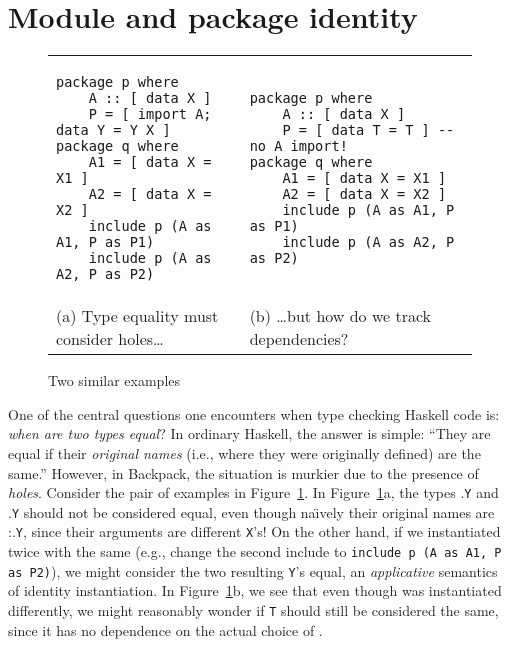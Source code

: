 \documentclass{article}
\begin{document}
\clearpage

\section{Module and package identity}

\begin{figure}[H]
\begin{tabular}{p{} p{}}
\begin{verbatim}
package p where
    A :: [ data X ]
    P = [ import A; data Y = Y X ]
package q where
    A1 = [ data X = X1 ]
    A2 = [ data X = X2 ]
    include p (A as A1, P as P1)
    include p (A as A2, P as P2)
\end{verbatim}
&
\begin{verbatim}
package p where
    A :: [ data X ]
    P = [ data T = T ] -- no A import!
package q where
    A1 = [ data X = X1 ]
    A2 = [ data X = X2 ]
    include p (A as A1, P as P1)
    include p (A as A2, P as P2)
\end{verbatim}
\\
(a) Type equality must consider holes\ldots &
(b) \ldots but how do we track dependencies? \\
\end{tabular}
\caption{Two similar examples}\label{fig:simple-ex}
\end{figure}

One of the central questions one encounters when type checking Haskell
code is: \emph{when are two types equal}?  In ordinary Haskell, the
answer is simple: ``They are equal if their \emph{original names} (i.e.,
where they were originally defined) are the same.''  However, in
Backpack, the situation is murkier due to the presence of \emph{holes}.
Consider the pair of examples in Figure~\ref{fig:simple-ex}.
In Figure~\ref{fig:simple-ex}a,  the types .\verb|Y| and .\verb|Y| should not be
considered equal, even though na\"\i vely their original names are
:.\verb|Y|, since their arguments are different \verb|X|'s!
On the other hand, if we instantiated  twice with the same 
(e.g., change the second include to \texttt{include p (A as A1, P as P2)}),
we might consider the two resulting \verb|Y|'s
equal, an \emph{applicative} semantics of identity instantiation.  In
Figure~\ref{fig:simple-ex}b, we see that even though  was instantiated differently,
we might reasonably wonder if \texttt{T} should still be considered the same,
since it has no dependence on the actual choice of .
\end{document}
